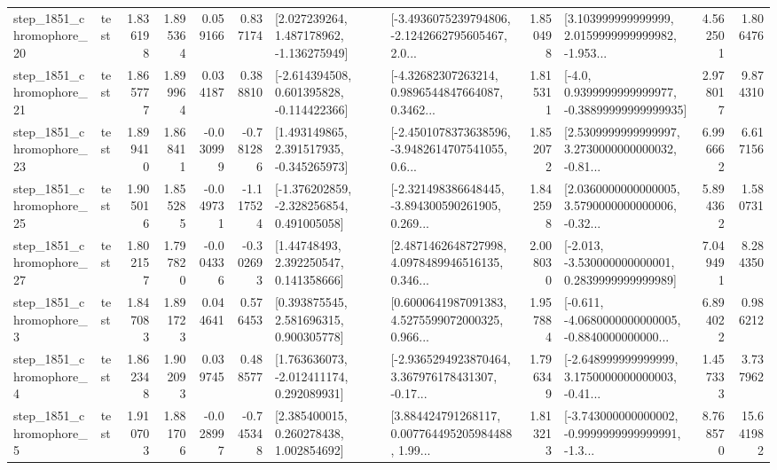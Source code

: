 \begin{tabular}{llrrrrllrlrr}
 step\_1851\_chromophore\_20 &      test &      1.836198 &    1.895364 &      0.059166 &  0.837174 &    [2.027239264, 1.487178962, -1.136275949] &  [-3.4936075239794806, -2.1242662795605467, 2.0... &       1.850498 &  [3.103999999999999, 2.0159999999999982, -1.953... &            4.562501 &          1.806476 \\
 step\_1851\_chromophore\_21 &      test &      1.865777 &    1.899964 &      0.034187 &  0.388810 &   [-2.614394508, 0.601395828, -0.114422366] &  [-4.32682307263214, 0.9896544847664087, 0.3462... &       1.815311 &   [-4.0, 0.9399999999999977, -0.38899999999999935] &            2.978017 &          9.874310 \\
 step\_1851\_chromophore\_23 &      test &      1.899410 &    1.868411 &     -0.030999 & -0.781286 &    [1.493149865, 2.391517935, -0.345265973] &  [-2.4501078373638596, -3.9482614707541055, 0.6... &       1.852072 &  [2.5309999999999997, 3.2730000000000032, -0.81... &            6.996662 &          6.617156 \\
 step\_1851\_chromophore\_25 &      test &      1.905016 &    1.855285 &     -0.049731 & -1.117524 &   [-1.376202859, -2.328256854, 0.491005058] &  [-2.321498386648445, -3.894300590261905, 0.269... &       1.842598 &  [2.0360000000000005, 3.5790000000000006, -0.32... &            5.894362 &          1.580731 \\
 step\_1851\_chromophore\_27 &      test &      1.802157 &    1.797820 &     -0.004336 & -0.302693 &      [1.44748493, 2.392250547, 0.141358666] &  [2.4871462648727998, 4.0978489946516135, 0.346... &       2.008030 &   [-2.013, -3.530000000000001, 0.2839999999999989] &            7.049491 &          8.284350 \\
  step\_1851\_chromophore\_3 &      test &      1.847083 &    1.891723 &      0.044641 &  0.576453 &     [0.393875545, 2.581696315, 0.900305778] &  [0.6000641987091383, 4.5275599072000325, 0.966... &       1.957884 &  [-0.611, -4.0680000000000005, -0.8840000000000... &            6.894022 &          0.986212 \\
  step\_1851\_chromophore\_4 &      test &      1.862348 &    1.902093 &      0.039745 &  0.488577 &    [1.763636073, -2.012411174, 0.292089931] &  [-2.9365294923870464, 3.367976178431307, -0.17... &       1.796349 &  [-2.648999999999999, 3.1750000000000003, -0.41... &            1.457333 &          3.737962 \\
  step\_1851\_chromophore\_5 &      test &      1.910703 &    1.881706 &     -0.028997 & -0.745348 &     [2.385400015, 0.260278438, 1.002854692] &  [3.884424791268117, 0.007764495205984488, 1.99... &       1.813213 &  [-3.743000000000002, -0.9999999999999991, -1.3... &            8.768570 &         15.641982 \\

\end{tabular}
